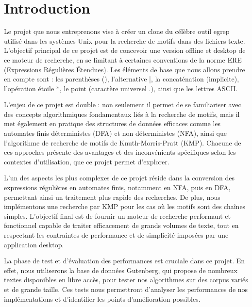 \documentclass[11pt,english]{article}
\begin{document}
\pagebreak

\tableofcontents

\pagebreak

\section{Introduction}

\indent 

Le projet que nous entreprenons vise à créer un clone du célèbre outil egrep utilisé dans les systèmes Unix pour la recherche de motifs dans des fichiers texte. L'objectif principal de ce projet est de concevoir une version offline et desktop de ce moteur de recherche, en se limitant à certaines conventions de la norme ERE (Expressions Régulières Étendues). Les éléments de base que nous allons prendre en compte sont : les parenthèses (), l'alternative |, la concaténation (implicite), l'opération étoile *, le point (caractère universel .), ainsi que les lettres ASCII.

\indent L'enjeu de ce projet est double : non seulement il permet de se familiariser avec des concepts algorithmiques fondamentaux liés à la recherche de motifs, mais il met également en pratique des structures de données efficaces comme les automates finis déterministes (DFA) et non déterministes (NFA), ainsi que l'algorithme de recherche de motifs de Knuth-Morris-Pratt (KMP). Chacune de ces approches présente des avantages et des inconvénients spécifiques selon les contextes d'utilisation, que ce projet permet d'explorer.

\indent L'un des aspects les plus complexes de ce projet réside dans la conversion des expressions régulières en automates finis, notamment en NFA, puis en DFA, permettant ainsi un traitement plus rapide des recherches. De plus, nous implémentons une recherche par KMP pour les cas où les motifs sont des chaînes simples. L'objectif final est de fournir un moteur de recherche performant et fonctionnel capable de traiter efficacement de grands volumes de texte, tout en respectant les contraintes de performance et de simplicité imposées par une application desktop.

\indent La phase de test et d'évaluation des performances est cruciale dans ce projet. En effet, nous utiliserons la base de données Gutenberg, qui propose de nombreux textes disponibles en libre accès, pour tester nos algorithmes sur des corpus variés et de grande taille. Ces tests nous permettront d'analyser les performances de nos implémentations et d'identifier les points d'amélioration possibles.
\end{document}
